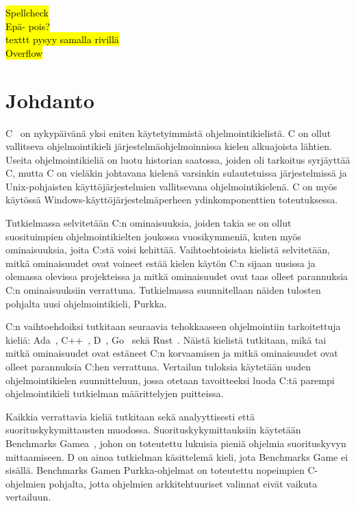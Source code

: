 \hl{Spellcheck} \\
\hl{Epä- pois?} \\
\hl{texttt pysyy samalla rivillä} \\
\hl{Overflow} \\

\newpage

\section{Johdanto}

C~\citep{C18} on nykypäivänä yksi eniten käytetyimmistä ohjelmointikielistä. C
on ollut vallitseva ohjelmointikieli järjestelmäohjelmoinnissa kielen
alkuajoista lähtien. Useita ohjelmointikieliä on luotu historian saatossa,
joiden oli tarkoitus syrjäyttää C, mutta C on vieläkin johtavana kielenä
varsinkin sulautetuissa järjestelmissä ja Unix-pohjaisten käyttöjärjestelmien
vallitsevana ohjelmointikielenä. C on myös käytössä
Windows-käyttöjärjestelmäperheen ydinkomponenttien toteutuksessa.

Tutkielmassa selvitetään C:n ominaisuuksia, joiden takia se on ollut
suosituimpien ohjelmointikielten joukossa vuosikymmeniä, kuten myös
ominaisuuksia, joita C:stä voisi kehittää. Vaihtoehtoisista kielistä
selvitetään, mitkä ominaisuudet ovat voineet estää kielen käytön C:n sijaan
uusissa ja olemassa olevissa projekteissa ja mitkä ominaisuudet ovat taas
olleet parannuksia C:n ominaisuuksiin verrattuna. Tutkielmassa suunnitellaan
näiden tulosten pohjalta uusi ohjelmointikieli, Purkka.

C:n vaihtoehdoiksi tutkitaan seuraavia tehokkaaseen ohjelmointiin tarkoitettuja
kieliä: Ada~\citep{ADA12}, C++~\citep{CPP17}, D~\citep{D}, Go~\citep{golang}
sekä Rust~\citep{rust}. Näistä kielistä tutkitaan, mikä tai mitkä ominaisuudet
ovat estäneet C:n korvaamisen ja mitkä ominaisuudet ovat olleet parannuksia
C:hen verrattuna. Vertailun tuloksia käytetään uuden ohjelmointikielen
suunnitteluun, jossa otetaan tavoitteeksi luoda C:tä parempi ohjelmointikieli
tutkielman määrittelyjen puitteissa.

Kaikkia verrattavia kieliä tutkitaan sekä analyyttisesti että
suorituskykymittausten muodossa. Suorituskykymittauksiin käytetään Benchmarks
Gamea~\citep{benchmarks}, johon on toteutettu lukuisia pieniä ohjelmia
suorituskyvyn mittaamiseen. D on ainoa tutkielman käsittelemä kieli, jota
Benchmarks Game ei sisällä. Benchmarks Gamen Purkka-ohjelmat on toteutettu
nopeimpien C-ohjelmien pohjalta, jotta ohjelmien arkkitehtuuriset valinnat
eivät vaikuta vertailuun. 

